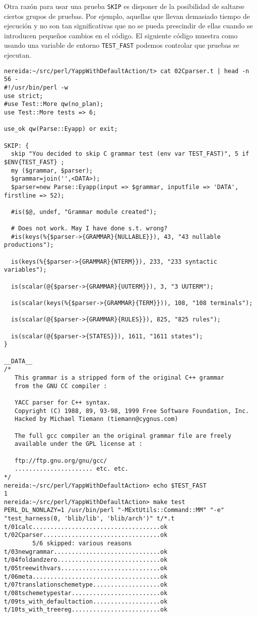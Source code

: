 \begin{enumerate}
Otra razón para usar una prueba \verb|SKIP| es disponer de la posibilidad
de saltarse ciertos grupos de pruebas. Por ejemplo, aquellas que llevan
demasiado tiempo de ejecución y no son tan significativas que no se 
pueda prescindir de ellas cuando se introducen pequeños cambios en el código.
El siguiente código muestra como usando una variable de entorno \verb|TEST_FAST|
podemos controlar que pruebas se ejecutan. 
\begin{verbatim}
nereida:~/src/perl/YappWithDefaultAction/t> cat 02Cparser.t | head -n 56 -
#!/usr/bin/perl -w
use strict;
#use Test::More qw(no_plan);
use Test::More tests => 6;

use_ok qw(Parse::Eyapp) or exit;

SKIP: {
  skip "You decided to skip C grammar test (env var TEST_FAST)", 5 if $ENV{TEST_FAST} ;
  my ($grammar, $parser);
  $grammar=join('',<DATA>);
  $parser=new Parse::Eyapp(input => $grammar, inputfile => 'DATA', firstline => 52);

  #is($@, undef, "Grammar module created");

  # Does not work. May I have done s.t. wrong?
  #is(keys(%{$parser->{GRAMMAR}{NULLABLE}}), 43, "43 nullable productions");

  is(keys(%{$parser->{GRAMMAR}{NTERM}}), 233, "233 syntactic variables");

  is(scalar(@{$parser->{GRAMMAR}{UUTERM}}), 3, "3 UUTERM");

  is(scalar(keys(%{$parser->{GRAMMAR}{TERM}})), 108, "108 terminals");

  is(scalar(@{$parser->{GRAMMAR}{RULES}}), 825, "825 rules");

  is(scalar(@{$parser->{STATES}}), 1611, "1611 states");
}

__DATA__
/*
   This grammar is a stripped form of the original C++ grammar
   from the GNU CC compiler :

   YACC parser for C++ syntax.
   Copyright (C) 1988, 89, 93-98, 1999 Free Software Foundation, Inc.
   Hacked by Michael Tiemann (tiemann@cygnus.com)

   The full gcc compiler an the original grammar file are freely
   available under the GPL license at :

   ftp://ftp.gnu.org/gnu/gcc/
   ...................... etc. etc.
*/
nereida:~/src/perl/YappWithDefaultAction> echo $TEST_FAST
1
nereida:~/src/perl/YappWithDefaultAction> make test
PERL_DL_NONLAZY=1 /usr/bin/perl "-MExtUtils::Command::MM" "-e" "test_harness(0, 'blib/lib', 'blib/arch')" t/*.t
t/01calc....................................ok
t/02Cparser.................................ok
        5/6 skipped: various reasons
t/03newgrammar..............................ok
t/04foldandzero.............................ok
t/05treewithvars............................ok
t/06meta....................................ok
t/07translationschemetype...................ok
t/08tschemetypestar.........................ok
t/09ts_with_defaultaction...................ok
t/10ts_with_treereg.........................ok


\end{verbatim}
\end{enumerate}
